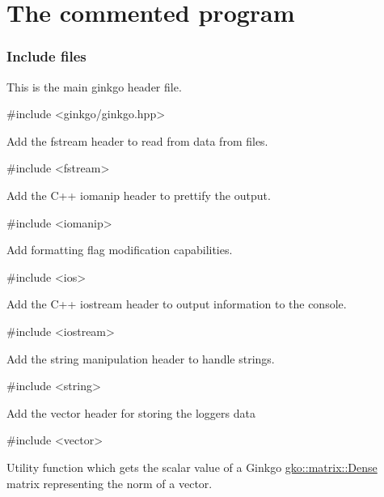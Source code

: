  \section*{The commented program}

\label{_Includefiles}%
 \subsubsection*{Include files}

This is the main ginkgo header file.


\begin{DoxyCode}
\textcolor{preprocessor}{#include <ginkgo/ginkgo.hpp>}
\end{DoxyCode}


Add the fstream header to read from data from files.


\begin{DoxyCode}
\textcolor{preprocessor}{#include <fstream>}
\end{DoxyCode}


Add the C++ iomanip header to prettify the output.


\begin{DoxyCode}
\textcolor{preprocessor}{#include <iomanip>}
\end{DoxyCode}


Add formatting flag modification capabilities.


\begin{DoxyCode}
\textcolor{preprocessor}{#include <ios>}
\end{DoxyCode}


Add the C++ iostream header to output information to the console.


\begin{DoxyCode}
\textcolor{preprocessor}{#include <iostream>}
\end{DoxyCode}


Add the string manipulation header to handle strings.


\begin{DoxyCode}
\textcolor{preprocessor}{#include <string>}
\end{DoxyCode}


Add the vector header for storing the logger\textquotesingle{}s data


\begin{DoxyCode}
\textcolor{preprocessor}{#include <vector>}
\end{DoxyCode}


Utility function which gets the scalar value of a Ginkgo \hyperlink{classgko_1_1matrix_1_1Dense}{gko\+::matrix\+::\+Dense} matrix representing the norm of a vector.


